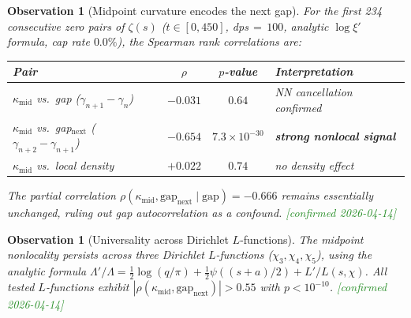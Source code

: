 \documentclass[11pt, a4paper]{article}
\theoremstyle{definition}
\theoremstyle{plain}
\newtheorem{observation}[theorem]{Observation}
\begin{document}
\begin{observation}[Midpoint curvature encodes the next gap]
\label{obs:midpoint_nonlocal}
For the first 234 consecutive zero pairs of $\zeta(s)$
($t\in[0,450]$, dps\,$=$\,$100$, analytic $\log\xi'$ formula,
cap rate $0.0\%$), the Spearman rank correlations are:
\begin{center}
\begin{tabular}{lccl}
\toprule
\textbf{Pair} & $\rho$ & $p$-value & \textbf{Interpretation} \\
\midrule
$\kappa_{\mathrm{mid}}$ vs.\ gap ($\gamma_{n+1}-\gamma_n$)
  & $-0.031$ & $0.64$ & NN cancellation confirmed \\
$\kappa_{\mathrm{mid}}$ vs.\ gap$_{\mathrm{next}}$ ($\gamma_{n+2}-\gamma_{n+1}$)
  & $-0.654$ & $7.3\times 10^{-30}$ & \textbf{strong nonlocal signal} \\
$\kappa_{\mathrm{mid}}$ vs.\ local density
  & $+0.022$ & $0.74$ & no density effect \\
\bottomrule
\end{tabular}
\end{center}
\noindent
The partial correlation $\rho(\kappa_{\mathrm{mid}},
\mathrm{gap}_{\mathrm{next}} \mid \mathrm{gap}) = -0.666$
remains essentially unchanged, ruling out gap autocorrelation
as a confound.
\textcolor{ForestGreen}{[confirmed 2026-04-14]}
\end{observation}

\begin{observation}[Universality across Dirichlet $L$-functions]
\label{obs:dirichlet_nonlocal}
The midpoint nonlocality persists across three Dirichlet $L$-functions
($\chi_3, \chi_4, \chi_5$), using the analytic formula
$\Lambda'/\Lambda = \tfrac{1}{2}\log(q/\pi)
  + \tfrac{1}{2}\psi((s+a)/2) + L'/L(s,\chi)$.
All tested $L$-functions exhibit $|\rho(\kappa_{\mathrm{mid}},
\mathrm{gap}_{\mathrm{next}})| > 0.55$ with $p < 10^{-10}$.
\textcolor{ForestGreen}{[confirmed 2026-04-14]}
\end{observation}
\end{document}
